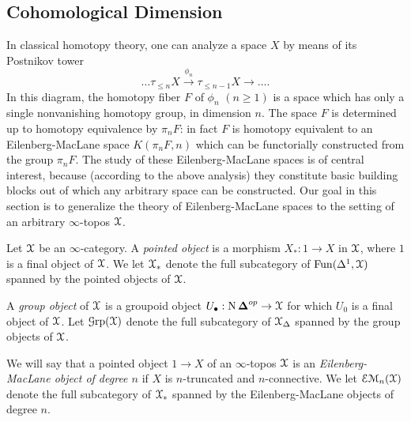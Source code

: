 \subsection{Cohomological Dimension}\label{chmdim}

In classical homotopy theory, one can analyze a space $X$ by means of its Postnikov tower
$$ \ldots \tau_{\leq n} X \stackrel{\phi_n}{\rightarrow} \tau_{\leq n-1} X \rightarrow \ldots.$$
In this diagram, the homotopy fiber $F$ of $\phi_n$ $(n \geq 1)$ is a space which has only a single nonvanishing homotopy group, in dimension $n$. The space $F$ is determined up to homotopy equivalence by $\pi_n F$: in fact $F$ is homotopy equivalent to an Eilenberg-MacLane space
$K( \pi_n F, n)$ which can be functorially constructed from the group $\pi_n F$. The study of these Eilenberg-MacLane spaces is of central interest, because (according to the above analysis) they constitute basic building blocks out of which any arbitrary space can be constructed.
Our goal in this section is to generalize the theory of Eilenberg-MacLane spaces to the setting of 
an arbitrary $\infty$-topos $\operatorname{\mathcal{X}}$.

\begin{definition}\label{gropab}
Let $\operatorname{\mathcal{X}}$ be an $\infty$-category. A {\it pointed object} is a morphism
$X_{\ast}: 1 \rightarrow X$ in $\operatorname{\mathcal{X}}$, where $1$ is a final object of $\operatorname{\mathcal{X}}$.
We let $\operatorname{\mathcal{X}}_{\ast}$ denote the full subcategory of $\operatorname{Fun}(\Delta^1,\operatorname{\mathcal{X}})$ spanned by the pointed objects of
$\operatorname{\mathcal{X}}$.

A {\it group object} of $\operatorname{\mathcal{X}}$ is a groupoid object $U_{\bullet}: \operatorname{N} \operatorname{{\bf \Delta}}^{op} \rightarrow \operatorname{\mathcal{X}}$ for which $U_0$ is a final object of $\operatorname{\mathcal{X}}$. Let $\operatorname{\mathcal{G}rp}(\operatorname{\mathcal{X}})$ denote the full subcategory
of $\operatorname{\mathcal{X}}_{\Delta}$ spanned by the group objects of $\operatorname{\mathcal{X}}$.

We will say that a pointed object $1 \rightarrow X$ of an $\infty$-topos $\operatorname{\mathcal{X}}$ is an {\it Eilenberg-MacLane object of degree $n$} if $X$ is $n$-truncated and $n$-connective. We let $\operatorname{\mathcal{E}\mathcal{M}}_n(\operatorname{\mathcal{X}})$ denote the full subcategory of $\operatorname{\mathcal{X}}_{\ast}$ spanned by the Eilenberg-MacLane objects of degree $n$.
\end{definition}

